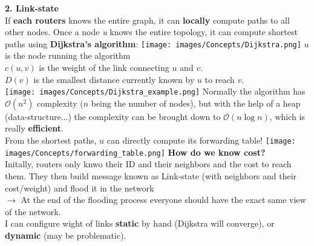 \documentclass[a4paper, fontsize=8pt, landscape, DIV=1]{scrartcl}
\begin{document}
\begin{multicols*}{4}
			\textbf{2. Link-state}\\
			If \textbf{each routers} knows the entire graph, it can \textbf{locally} compute paths to all other nodes. Once a node \textit{u} knows the entire topology, it can compute shortest paths using \textbf{Dijkstra's algorithm}:
			\texttt{[image: images/Concepts/Dijkstra.png]}
			$u$ is the node running the algorithm\\
			$c(u,v)$ is the weight of the link connecting $u$ and $v$. \\
			$D(v)$ is the smallest distance currently known by $u$ to reach $v$.\\
			\texttt{[image: images/Concepts/Dijkstra\_example.png]} 
			Normally the algorithm has $\mathcal{O}(n^2)$ complexity ($n$ being the number of nodes), but with the help of a heap (data-structure...) the complexity can be brought down to $\mathcal{O}(n\log n)$, which is really \textbf{efficient}.\\
			From the shortest paths, $u$ can directly compute its forwarding table! 
		    \texttt{[image: images/Concepts/forwarding\_table.png]} 	 
		    \textbf{How do we know cost?}\\
		   	Initally, routers only knwo their ID and their neighbors and the cost to reach them. They then build message known as Link-state (with neighbors and their cost/weight) and flood it in the network\\
		    $\rightarrow$ At the end of the flooding process everyone should have the exact same view of the network. \\
		    I can configure wight of links \textbf{static} by hand (Dijkstra will converge), or \textbf{dynamic} (may be problematic).\par 
		    

\end{multicols*}
\end{document}
